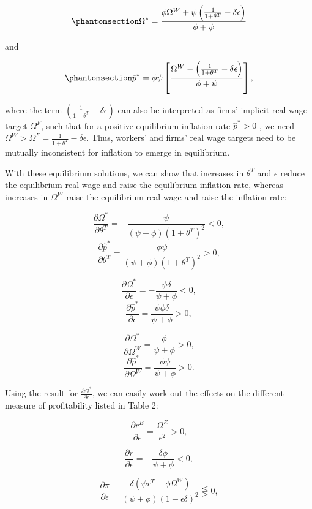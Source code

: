 \documentclass[
  letterpaper,
  DIV=11,
  numbers=noendperiod]{scrreprt}
\begin{document}
\begin{equation}\phantomsection\label{eq-conflict_omega_eq}{\Omega^* = \frac{\phi \Omega^W+ \psi \left(\frac{1}{1+\theta^T}- \delta \epsilon \right)}{\phi + \psi}
}\end{equation}

and

\begin{equation}\phantomsection\label{eq-conflict_infl_eq}{
\hat{p}^* = \phi \psi \left[\frac{ \Omega^W - \left(\frac{1}{1+\theta^T}- \delta \epsilon \right)}{\phi + \psi}\right],
}\end{equation}

where the term \(\left(\frac{1}{1+\theta^T}- \delta \epsilon\right)\)
can also be interpreted as firms' implicit real wage target
\(\Omega^F\), such that for a positive equilibrium inflation rate
\(\hat{p}^* >0\) , we need
\(\Omega^W > \Omega^F = \frac{1}{1+\theta^T}- \delta \epsilon\). Thus,
workers' and firms' real wage targets need to be mutually inconsistent
for inflation to emerge in equilibrium.

With these equilibrium solutions, we can show that increases in
\(\theta^T\) and \(\epsilon\) reduce the equilibrium real wage and raise
the equilibrium inflation rate, whereas increases in \(\Omega^W\) raise
the equilibrium real wage and raise the inflation rate:

\[
\frac{\partial \Omega^*} {\partial \theta^T} = -\frac{\psi}{(\psi + \phi)(1+\theta^T)^2} < 0,
\] \[
\frac{\partial \hat{p}^*}{\partial \theta^T} = \frac{\phi\psi}{(\psi + \phi)(1+\theta^T)^2} > 0,
\]

\[
\frac{\partial \Omega^*}{\partial \epsilon} = -\frac{\psi \delta}{\psi + \phi} < 0,
\] \[
\frac{\partial \hat{p}^*}{\partial \epsilon} = \frac{\psi \phi \delta}{\psi + \phi} > 0,
\]

\[
\frac{\partial \Omega^*} {\partial \Omega^W} = \frac{\phi}{\psi + \phi} > 0,
\] \[
\frac{\partial \hat{p}^*}{\partial \Omega^W} = \frac{\phi\psi}{\psi + \phi} > 0.
\]

Using the result for \(\frac{\partial \Omega^*}{\partial \epsilon}\), we
can easily work out the effects on the different measure of
profitability listed in Table 2:

\[
\frac{\partial r^E}{\partial \epsilon} = \frac{\Omega^E}{\epsilon^2} > 0,
\]

\[
\frac{\partial r}{\partial \epsilon} =  -\frac{\delta \phi}{\psi + \phi} < 0,
\]

\[
\frac{\partial \pi}{\partial \epsilon} =   \frac{\delta(\psi r^T-\phi\Omega^W)}{(\psi + \phi)(1-\epsilon\delta)^2} \lesseqgtr 0, 
\]
\end{document}
